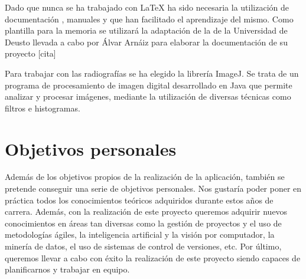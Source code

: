 Dado que nunca se ha trabajado con \LaTeX{} ha sido necesaria la utilización de documentación , manuales  y  que han facilitado el aprendizaje del mismo. Como plantilla para la memoria se utilizará la adaptación de la de la Universidad de Deusto llevada a cabo por Álvar Arnáiz para elaborar la documentación de su proyecto [cita]

Para trabajar con las radiografías se ha elegido la librería ImageJ. Se trata de un programa de procesamiento de imagen digital desarrollado en Java que permite analizar y procesar imágenes, mediante la utilización de diversas técnicas como filtros e histogramas.

\section{Objetivos personales}
Además de los objetivos propios de la realización de la aplicación, también se pretende conseguir una serie de objetivos personales.
Nos gustaría poder poner en práctica todos los conocimientos teóricos adquiridos durante estos años de carrera. Además, con la realización de este proyecto queremos adquirir nuevos conocimientos en áreas tan diversas como la gestión de proyectos y el uso de metodologías ágiles, la inteligencia artificial y la visión por computador, la minería de datos, el uso de sistemas de control de versiones, etc.
Por último, queremos llevar a cabo con éxito la realización de este proyecto siendo capaces de planificarnos y trabajar en equipo.


